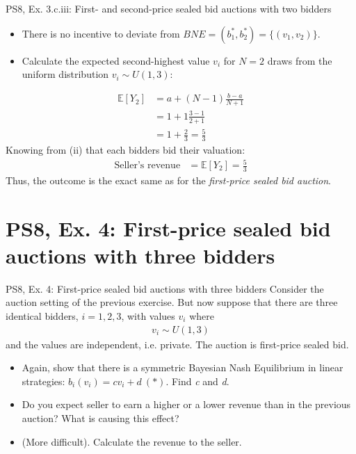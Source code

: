 \begin{frame}{PS8, Ex. 3.c.iii: First- and second-price sealed bid auctions with two bidders}
\begin{multicols}{2}
      \vspace{-18pt}
      \begin{itemize}
        \item[(ii)] There is no incentive to deviate from $BNE=(b_1^*,b_2^*)=\{(v_1,v_2)\}$.
        \item[(iii)] Calculate the expected second-highest value $v_i$ for $N=2$ draws from the uniform distribution $v_i\sim U(1,3)$:
      \end{itemize}
      \vspace{-16pt}
      \begin{align*}
        \mathbb{E}[Y_2]&=a+(N-1)\frac{b-a}{N+1}\\
                       &=1+1\frac{3-1}{2+1}\\
                       &=1+\frac{2}{3}=\frac{5}{3}
      \end{align*}
      Knowing from (ii) that each bidders bid their valuation:
      \vspace{-8pt}
      \begin{align*}
        \text{Seller's revenue}&=\mathbb{E}[Y_2]=\frac{5}{3}
      \end{align*}
      Thus, the outcome is the exact same as for the \textit{first-price sealed bid auction}.
      \vfill\null
    \end{multicols}
\end{frame}



\section{PS8, Ex. 4: First-price sealed bid auctions with three bidders}

\begin{frame}{PS8, Ex. 4: First-price sealed bid auctions with three bidders}
    Consider the auction setting of the previous exercise. But now suppose that there are three identical bidders, $i = 1, 2, 3$, with values $v_i$ where
    \begin{align*}
      v_i\sim U(1, 3)
    \end{align*}
    and the values are independent, i.e. private. The auction is first-price sealed bid.
    \begin{itemize}
      \item[(a)] Again, show that there is a symmetric Bayesian Nash Equilibrium in linear strategies: $b_i(v_i) = cv_i + d\ (*)$. Find \textit{c} and \textit{d}.
      \item[(b)] Do you expect seller to earn a higher or a lower revenue than in the previous auction? What is causing this effect?
      \item[(c)] (More difficult). Calculate the revenue to the seller.
    \end{itemize}
    \vfill\null
\end{frame}


